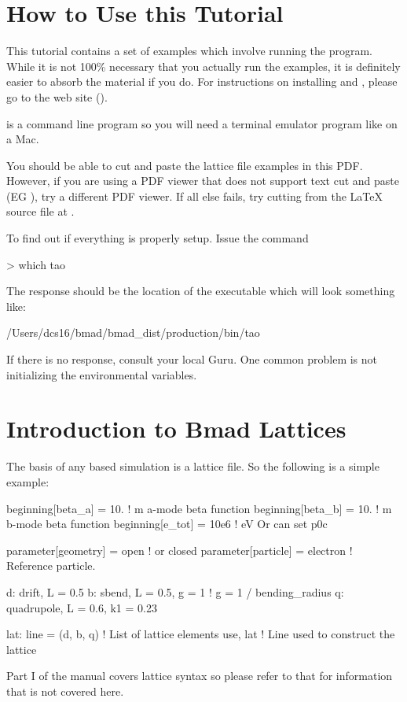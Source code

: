 \documentclass{hitec}
\newcommand{\Section}[1]{\section{#1}\vspace*{-1ex}}
\begin{document}
\Section{How to Use this Tutorial}

This tutorial contains a set of examples which involve running the \tao program.  While it is not
100\% necessary that you actually run the examples, it is definitely easier to absorb the material
if you do. For instructions on installing \bmad and \tao, please go to the \bmad web site
().

\tao is a command line program so you will need a terminal emulator program like  on a
Mac.

You should be able to cut and paste the lattice file examples in this PDF. However, if you are using
a PDF viewer that does not support text cut and paste (EG ), try a different PDF viewer. If
all else fails, try cutting from the LaTeX source file at
.

To find out if everything is properly setup. Issue the command
\begin{code}
> which tao
\end{code}
The response should be the location of the \tao executable which will look something like:
\begin{code}
/Users/dcs16/bmad/bmad_dist/production/bin/tao
\end{code}
If there is no response, consult your local \bmad Guru. One common problem is not initializing
the \bmad environmental variables.

\Section{Introduction to Bmad Lattices}
\label{s:bmad.intro}

The basis of any \bmad based simulation is a lattice file. So the following is a
simple example:
\begin{code}
beginning[beta_a] = 10.   ! m  a-mode beta function
beginning[beta_b] = 10.   ! m  b-mode beta function
beginning[e_tot] = 10e6   ! eV   Or can set p0c

parameter[geometry] = open      ! or closed
parameter[particle] = electron  ! Reference particle.

d: drift, L = 0.5
b: sbend, L = 0.5, g = 1    ! g = 1 / bending_radius
q: quadrupole, L = 0.6, k1 = 0.23

lat: line = (d, b, q)   ! List of lattice elements
use, lat                ! Line used to construct the lattice
\end{code}
Part I of the \bmad manual covers lattice syntax so please refer to that for information that
is not covered here.
\end{document}

